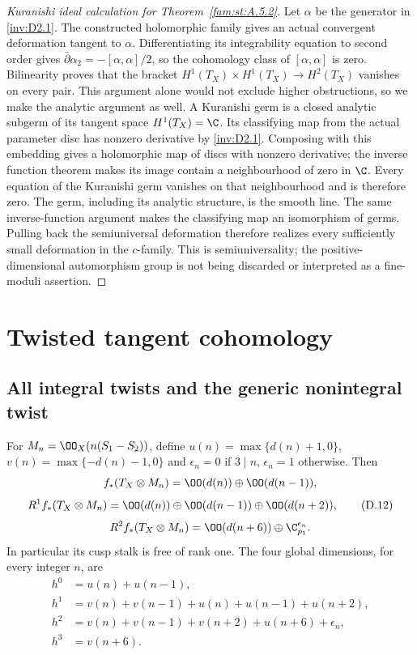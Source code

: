 \begin{proof}[Kuranishi ideal calculation for Theorem~\ref{fam:st:A.5.2}]
Let $\alpha$ be the generator in \ref{inv:D2.1}. The constructed holomorphic
family gives an actual convergent deformation tangent to $\alpha$.
Differentiating its integrability equation to second order gives
$\bar\partial\alpha_2=-[\alpha,\alpha]/2$, so the cohomology class
of $[\alpha,\alpha]$ is zero. Bilinearity proves that the bracket
$H^1(T_X)\times H^1(T_X)\to H^2(T_X)$ vanishes on every pair.
This argument alone would not exclude higher obstructions, so we
make the analytic argument as well. A Kuranishi germ is a closed
analytic subgerm of its tangent space $H^1(T_X)=\C$. Its classifying
map from the actual parameter disc has nonzero derivative by \ref{inv:D2.1}.
Composing with this embedding gives a holomorphic map of discs with
nonzero derivative; the inverse function theorem makes its image
contain a neighbourhood of zero in $\C$. Every equation of the
Kuranishi germ vanishes on that neighbourhood and is therefore zero.
The germ, including its analytic structure, is the smooth line.
The same inverse-function argument makes the classifying map an
isomorphism of germs. Pulling back the semiuniversal deformation
therefore realizes every sufficiently small deformation in the
$c$-family. This is semiuniversality; the positive-dimensional
automorphism group is not being discarded or interpreted as a
fine-moduli assertion.
\end{proof}




\section{Twisted tangent cohomology}
\subsection{All integral twists and the generic nonintegral twist}

\begin{proposition}\label{inv:D4.1}
For $M_n=\OO_X(n(S_1-S_2))$, define
$u(n)=\max\{d(n)+1,0\}$, $v(n)=\max\{-d(n)-1,0\}$ and
$\epsilon_n=0$ if $3\mid n$, $\epsilon_n=1$ otherwise. Then
\[
 f_*(T_X\otimes M_n)=\OO(d(n))\oplus\OO(d(n-1)),
\]
\[
 R^1f_*(T_X\otimes M_n)=
 \OO(d(n))\oplus\OO(d(n-1))\oplus\OO(d(n+2)),           \tag{D.12}
\]
\[
 R^2f_*(T_X\otimes M_n)=
 \OO(d(n+6))\oplus\C_{p_1}^{\epsilon_n}.
\]
In particular its cusp stalk is free of rank one. The four global
dimensions, for every integer $n$, are
\begin{align*}
 h^0&=u(n)+u(n-1),\\
 h^1&=v(n)+v(n-1)+u(n)+u(n-1)+u(n+2),\\
 h^2&=v(n)+v(n-1)+v(n+2)+u(n+6)+\epsilon_n,\\
 h^3&=v(n+6).                                          \tag{D.13}
\end{align*}
\end{proposition}

